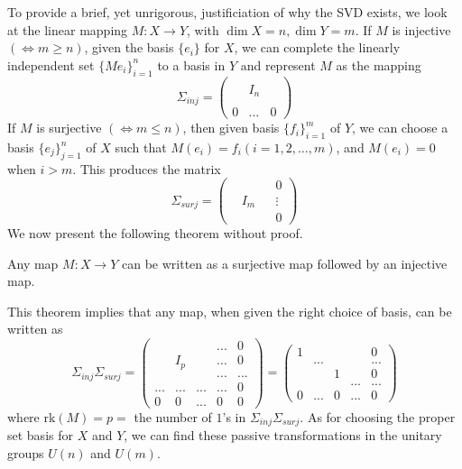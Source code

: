   To provide a brief, yet unrigorous, justificiation of why the SVD exists, we look at the linear mapping $M: X \longrightarrow Y$, with $\dim{X} = n, \dim{Y} = m$. If $M$ is injective $(\iff m \geq n)$, given the basis $\{e_i\}$ for $X$, we can complete the linearly independent set $\{Me_i\}_{i=1}^n$ to a basis in $Y$ and represent $M$ as the mapping
  \begin{equation}
    \Sigma_{inj} = \begin{pmatrix} &&\\ &I_n&\\ &&\\ 0&\ldots &0 \end{pmatrix}
  \end{equation}
  If $M$ is surjective $(\iff m \leq n)$, then given basis $\{f_i\}_{i=1}^m$ of $Y$, we can choose a basis $\{e_j\}_{j=1}^n$ of $X$ such that $M(e_i) = f_i (i = 1, 2, \ldots, m)$, and $M(e_i) = 0$ when $i > m$. This produces the matrix
  \begin{equation}
    \Sigma_{surj} = \begin{pmatrix} &&&0\\&I_m&& \vdots \\&&&0\end{pmatrix}
  \end{equation}
  We now present the following theorem without proof. 

  \begin{theorem}
    Any map $M: X \longrightarrow Y$ can be written as a surjective map followed by an injective map. 
  \end{theorem}

  This theorem implies that any map, when given the right choice of basis, can be written as 
  \begin{equation}
    \Sigma_{inj} \Sigma_{surj} = \begin{pmatrix}
    &&&...&0\\
    &I_p&&...&0\\
    &&&...&...\\
    ...&...&...&...&0\\
    0&0&...&0&0
    \end{pmatrix} = \begin{pmatrix}
    1&&&&0\\
    &...&&&...\\
    &&1&&0\\
    &&&...&...\\
    0&...&0&...&0
    \end{pmatrix}
  \end{equation}
  where rk$(M) = p = $ the number of $1$'s in $\Sigma_{inj} \Sigma_{surj}$. As for choosing the proper set basis for $X$ and $Y$, we can find these passive transformations in the unitary groups $U(n)$ and $U(m)$. 

